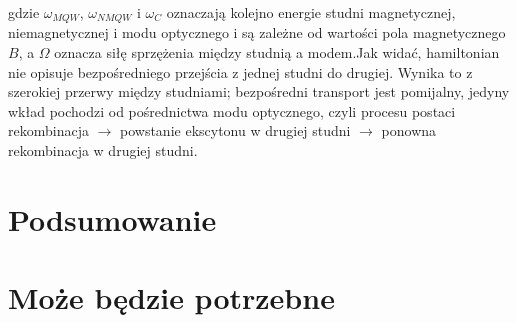 \documentclass[licencjacka]{pracamgr}
\begin{document}
gdzie $\omega_{MQW}$, $\omega_{NMQW}$ i $\omega_{C}$ oznaczają kolejno energie studni magnetycznej, niemagnetycznej i modu optycznego i są zależne od wartości pola magnetycznego $B$, a $\Omega$ oznacza siłę sprzężenia między studnią a modem.Jak widać, hamiltonian nie opisuje bezpośredniego przejścia z jednej studni do drugiej. Wynika to z szerokiej przerwy między studniami; bezpośredni transport jest pomijalny, jedyny wkład pochodzi od pośrednictwa modu optycznego, czyli procesu postaci rekombinacja $\rightarrow$ powstanie ekscytonu w drugiej studni $\rightarrow$ ponowna rekombinacja w drugiej studni.%



\chapter{Podsumowanie}


\appendix

\chapter{Może będzie potrzebne}



\end{document}
